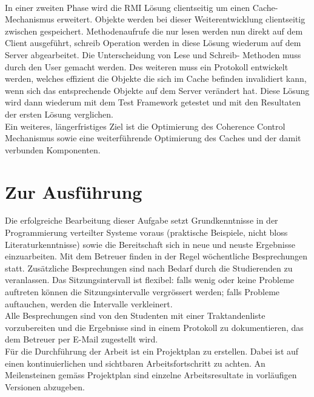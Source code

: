 \documentclass{article}
\begin{document}
\\
In einer zweiten Phase wird die RMI Lösung clientseitig um einen Cache-Mechanismus erweitert. Objekte werden bei dieser Weiterentwicklung clientseitig zwischen gespeichert. Methodenaufrufe die nur lesen werden nun direkt auf dem Client ausgeführt, schreib Operation werden in diese Lösung wiederum auf dem Server abgearbeitet. Die Unterscheidung von Lese und Schreib- Methoden muss durch den User gemacht werden. Des weiteren muss ein Protokoll entwickelt werden, welches effizient die Objekte die sich im Cache befinden invalidiert kann, wenn sich das entsprechende Objekte auf dem Server verändert hat. Diese Lösung wird dann wiederum mit dem Test Framework getestet und mit den Resultaten der ersten Lösung verglichen.\\
Ein weiteres, längerfristiges Ziel ist die Optimierung des Coherence Control Mechanismus sowie eine weiterführende Optimierung des Caches und der damit verbunden Komponenten.

\section{Zur Ausführung}
Die erfolgreiche Bearbeitung dieser Aufgabe setzt Grundkenntnisse in der Programmierung verteilter Systeme voraus (praktische Beispiele, nicht bloss Literaturkenntnisse) sowie die Bereitschaft sich in neue und neuste Ergebnisse einzuarbeiten.
Mit dem Betreuer finden in der Regel wöchentliche Besprechungen statt. Zusätzliche Besprechungen sind nach Bedarf durch die Studierenden zu veranlassen. Das Sitzungsintervall ist flexibel: falls wenig oder keine Probleme auftreten können die Sitzungsintervalle vergrössert werden; falls Probleme auftauchen, werden die Intervalle verkleinert.\\
Alle Besprechungen sind von den Studenten mit einer Traktandenliste vorzubereiten und die Ergebnisse sind in einem Protokoll zu dokumentieren, das dem Betreuer per E-Mail zugestellt wird.\\
Für die Durchführung der Arbeit ist ein Projektplan zu erstellen. Dabei ist auf einen kontinuierlichen und sichtbaren Arbeitsfortschritt zu achten. An Meilensteinen gemäss Projektplan sind einzelne Arbeitsresultate in vorläufigen Versionen abzugeben. 
\end{document}
